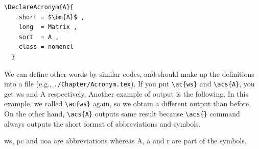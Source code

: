 \begin{lstlisting}[caption=Example of a definition for a symbol, label=code:acro2]
  \DeclareAcronym{A}{
    short = $\bm{A}$ ,
    long  = Matrix ,
    sort  = A ,
    class = nomencl
  }
\end{lstlisting}

We can define other words by similar codes, and should make up the definitions into a file (e.g., \texttt{./Chapter/Acronym.tex}). If you put \verb+\ac{ws}+ and \verb+\acs{A}+, you get \ac{ws} and \acs{A} respectively. Another example of output is the following. In this example, we called \verb+\ac{ws}+ again, so we obtain a different output than before. On the other hand, \verb+\acs{A}+ outputs same result because \verb+\acs{}+ command always outputs the short format of abbreviations and symbols.

\begin{screen}
\ac{ws}, \ac{pc} and \ac{uoa} are abbreviations whereas \acs{A}, \acs{a} and \acs{r} are part of the symbols.
\end{screen}
